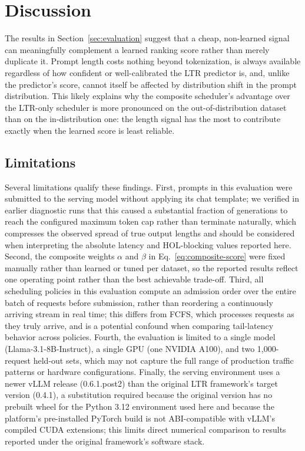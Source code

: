 \section{Discussion}
\label{sec:discussion}

The results in Section~\ref{sec:evaluation} suggest that a cheap, non-learned
signal can meaningfully complement a learned ranking score rather than merely
duplicate it. Prompt length costs nothing beyond tokenization, is always
available regardless of how confident or well-calibrated the LTR predictor
is, and, unlike the predictor's score, cannot itself be affected by
distribution shift in the prompt distribution. This likely explains why the
composite scheduler's advantage over the LTR-only scheduler is more
pronounced on the out-of-distribution dataset than on the in-distribution
one: the length signal has the most to contribute exactly when the learned
score is least reliable.

\subsection{Limitations}
\label{subsec:limitations}

Several limitations qualify these findings. First, prompts in this evaluation
were submitted to the serving model without applying its chat template; we
verified in earlier diagnostic runs that this caused a substantial fraction of
generations to reach the configured maximum token cap rather than terminate
naturally, which compresses the observed spread of true output lengths and
should be considered when interpreting the absolute latency and HOL-blocking
values reported here. Second, the composite weights $\alpha$ and $\beta$ in
Eq.~\eqref{eq:composite-score} were fixed manually rather than learned or
tuned per dataset, so the reported results reflect one operating point rather
than the best achievable trade-off. Third, all scheduling policies in this
evaluation compute an admission order over the entire batch of requests
before submission, rather than reordering a continuously arriving stream in
real time; this differs from FCFS, which processes requests as they truly
arrive, and is a potential confound when comparing tail-latency behavior
across policies. Fourth, the evaluation is limited to a single model
(Llama-3.1-8B-Instruct), a single GPU (one NVIDIA A100), and two
1{,}000-request held-out sets, which may not capture the full range of
production traffic patterns or hardware configurations. Finally, the serving
environment uses a newer vLLM release (0.6.1.post2) than the original LTR
framework's target version (0.4.1), a substitution required because the
original version has no prebuilt wheel for the Python 3.12 environment used
here and because the platform's pre-installed PyTorch build is not
ABI-compatible with vLLM's compiled CUDA extensions; this limits direct
numerical comparison to results reported under the original framework's
software stack.

